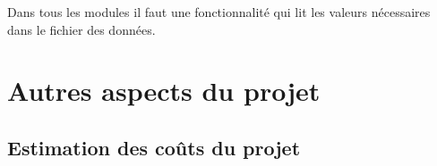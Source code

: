 \documentclass[a4paper,11pt]{article}
\begin{document}
		Dans tous les modules il faut une fonctionnalité qui lit les valeurs nécessaires dans le fichier des données.
		
	\section{Autres aspects du projet}
		\subsection{Estimation des coûts du projet}
			
\end{document}
